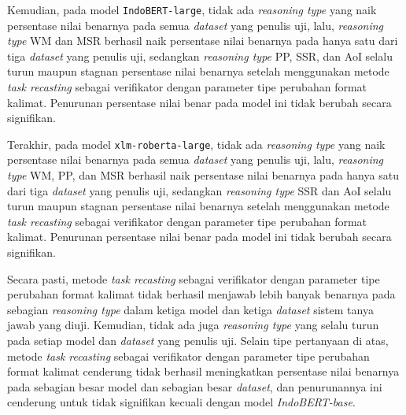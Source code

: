 Kemudian, pada model \texttt{IndoBERT-large}, tidak ada \emph{reasoning type} yang naik persentase nilai benarnya pada semua \emph{dataset} yang penulis uji, lalu, \emph{reasoning type} WM dan MSR berhasil naik persentase nilai benarnya pada hanya satu dari tiga \emph{dataset} yang penulis uji, sedangkan \emph{reasoning type} PP, SSR, dan AoI selalu turun maupun stagnan persentase nilai benarnya setelah menggunakan metode \emph{task recasting} sebagai verifikator dengan parameter tipe perubahan format kalimat. Penurunan persentase nilai benar pada model ini tidak berubah secara signifikan.

Terakhir, pada model \texttt{xlm-roberta-large}, tidak ada \emph{reasoning type} yang naik persentase nilai benarnya pada semua \emph{dataset} yang penulis uji, lalu, \emph{reasoning type} WM, PP, dan MSR berhasil naik persentase nilai benarnya pada hanya satu dari tiga \emph{dataset} yang penulis uji, sedangkan \emph{reasoning type} SSR dan AoI selalu turun maupun stagnan persentase nilai benarnya setelah menggunakan metode \emph{task recasting} sebagai verifikator dengan parameter tipe perubahan format kalimat. Penurunan persentase nilai benar pada model ini tidak berubah secara signifikan.

Secara pasti, metode \emph{task recasting} sebagai verifikator dengan parameter tipe perubahan format kalimat tidak berhasil menjawab lebih banyak benarnya pada sebagian \emph{reasoning type} dalam ketiga model dan ketiga \emph{dataset} sistem tanya jawab yang diuji. Kemudian, tidak ada juga \emph{reasoning type} yang selalu turun pada setiap model dan \emph{dataset} yang penulis uji. Selain tipe pertanyaan di atas, metode \emph{task recasting} sebagai verifikator dengan parameter tipe perubahan format kalimat cenderung tidak berhasil meningkatkan persentase nilai benarnya pada sebagian besar model dan sebagian besar \emph{dataset}, dan penurunannya ini cenderung untuk tidak signifikan kecuali dengan model \emph{IndoBERT-base}.